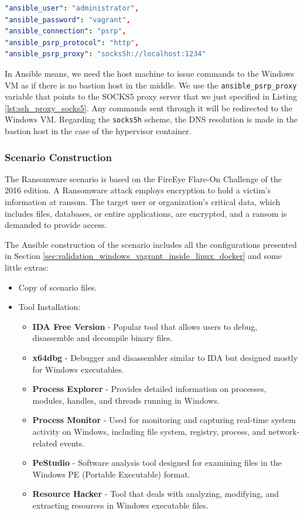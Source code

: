 \begin{lstlisting}[language=yaml,caption=Ansible Variables For The Hypervisor Container.,numbers=none,label={lst:ssh_proxy_socks5}]
"ansible_user": "administrator",
"ansible_password": "vagrant",
"ansible_connection": "psrp",
"ansible_psrp_protocol": "http",
"ansible_psrp_proxy": "socks5h://localhost:1234"
\end{lstlisting}

In Ansible means, we need the host machine to issue commands to the Windows VM as if there is no bastion host in the middle. We use the \texttt{ansible\_psrp\_proxy} variable that points to the SOCKS5 proxy server that we just specified in Listing \ref{lst:ssh_proxy_socks5}. Any commands sent through it will be redirected to the Windows VM. Regarding the \texttt{socks5h} scheme, the DNS resolution is made in the bastion host in the case of the hypervisor container.

\subsubsection{Scenario Construction} \label{sec:validation_ransomware_construction}

The Ransomware scenario is based on the FireEye Flare-On Challenge of the 2016 edition. A Ransomware attack employs encryption to hold a victim's information at ransom. The target user or organization's critical data, which includes files, databases, or entire applications, are encrypted, and a ransom is demanded to provide access. 

The Ansible construction of the scenario includes all the configurations presented in Section \ref{sec:validation_windows_vagrant_inside_linux_docker} and some little extras:

\begin{itemize}
    \item Copy of scenario files.
    \item Tool Installation:
    \begin{itemize}
        \item \textbf{IDA Free Version} - Popular tool that allows users to debug, disassemble and decompile binary files.
        \item \textbf{x64dbg} - Debugger and disassembler similar to IDA but designed mostly for Windows executables.
        \item \textbf{Process Explorer} - Provides detailed information on processes, modules, handles, and threads running in Windows.
        \item \textbf{Process Monitor} - Used for monitoring and capturing real-time system activity on Windows, including file system, registry, process, and network-related events.
        \item \textbf{PeStudio} - Software analysis tool designed for examining files in the Windows PE (Portable Executable) format.
        \item \textbf{Resource Hacker} - Tool that deals with analyzing, modifying, and extracting resources in Windows executable files.
    \end{itemize}
\end{itemize}

